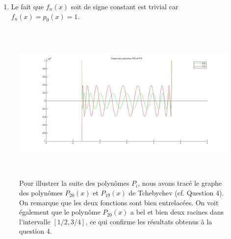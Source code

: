 \begin{enumerate}
\begin{proof}
      Comme les racines sont entrelacées, dans l'intervalle $]-\infty; \xi[$,
      il y a le même nombre de racines de $f_0$ que de racines de $f_1$.
      Ils ont donc changé de signe le même nombre de fois.
      Ils sont dès lors toujours de signe opposé comme en $-\infty$.
    \end{proof}

    Soit $\epsilon > 0$ tel que
    $f_1(x), f_0'(x) \neq 0$ $\forall x \in [\xi - \epsilon, \xi]$.
    On sait que $f_0'(\xi)f_0(\xi - \epsilon) < 0$.
    En effet, soit $q(x)$ tel que $q(\xi) \neq 0$ et
    $f_0(x) = (x - \xi) q(x)$.
    Comme $f_0(x) \neq 0$
    $\forall x \in [\xi-\epsilon;\xi[$, on a aussi
    $q(x) \neq 0$ $\forall x \in [\xi - \epsilon;\xi]$.
    On a $f_0'(x) = q(x) + (x - \xi) q'(x)$ d'où
    $f_0(\xi - \epsilon) = -\epsilon q(\xi - \epsilon)$ et
    $f_0'(\xi) = q(\xi)$.

    La fonction $q$ est un polynôme et est par conséquent continu sur $]-\infty, +\infty[$.
    Et comme il ne possède pas de racines entre $\xi - \epsilon$ et $\xi$,
    $q(\xi - \epsilon)$ et $q(\xi)$ sont de même signe.
    Avec le même raisonnement on montre que $f_1(\xi - \epsilon)$ et
    $f_1(\xi)$ sont de même signe.
    Comme $\epsilon > 0$, on peut déduire que $p_0'(\xi)$ et
    $p_0(\xi - \epsilon)$ sont de signe opposé.
    Puisqu'on sait que $p_0(\xi - \epsilon)$ et $p_1(\xi - \epsilon)$ sont
    de signe opposé, on obtient finalement $p_0'(\xi) p_1(\xi) > 0$.
  \item Le fait que $f_n(x)$ soit de signe constant est trivial car
    $f_n(x) = p_0(x) = 1$.
\end{enumerate}

\begin{figure}
  \centering
  \includegraphics[height=8cm]{fig3.jpg}
  \caption{Pour illustrer la suite des polynômes $P_i$,
  nous avons tracé le graphe des polynômes $P_{20}(x)$ et $P_{19}(x)$ de
  Tchebychev (cf. Question 4).
  On remarque que les deux fonctions sont bien entrelacées.
  On voit également que le polynôme $P_{20}(x)$ a bel et bien deux racines dans
  l'intervalle $[1/2, 3/4]$,
  ce qui confirme les résultats obtenus à la question 4.}
  \label{figure_Tcheb}
\end{figure}
